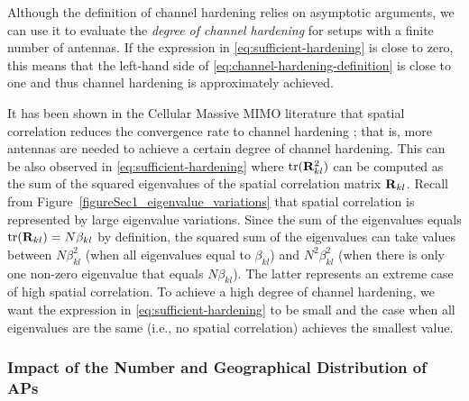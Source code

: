 Although the definition of channel hardening relies on asymptotic arguments, we can use it to evaluate the \emph{degree of channel hardening} for setups with a finite number of antennas. If the expression in \eqref{eq:sufficient-hardening} is close to zero, this means that the left-hand side of \eqref{eq:channel-hardening-definition} is close to one and thus channel hardening is approximately achieved.
 
It has been shown in the Cellular Massive MIMO literature that spatial correlation reduces the convergence rate to channel hardening \cite[Sec.~2.5.1]{massivemimobook}; that is, more antennas are needed to achieve a certain degree of channel hardening.
This can be also observed in \eqref{eq:sufficient-hardening} where $\mathrm{tr} ( \mathbf{R}_{kl}^2 )$ can be computed as the sum of the squared eigenvalues of the spatial correlation matrix $\mathbf{R}_{kl}$. Recall from Figure~\ref{figureSec1_eigenvalue_variations} that spatial correlation is represented by large eigenvalue variations.
Since the sum of the eigenvalues equals $\mathrm{tr}(\mathbf{R}_{kl}) = N \beta_{kl}$ by definition, the squared sum of the eigenvalues can take values between $N \beta_{kl}^2$ (when all eigenvalues equal to $ \beta_{kl}$) and $N^2\beta_{kl}^2$ (when there is only one non-zero eigenvalue that equals $N \beta_{kl}$).
The latter represents an extreme case of high spatial correlation.
To achieve a high degree of channel hardening, we want the expression in \eqref{eq:sufficient-hardening} to be small and the case when all eigenvalues are the same (i.e., no spatial correlation) achieves the smallest value.

\subsubsection{Impact of the Number and Geographical Distribution of APs}

